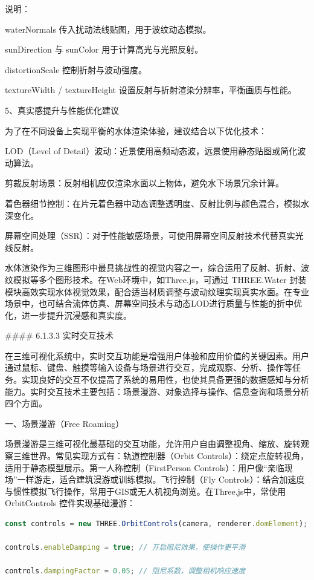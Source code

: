 说明：

waterNormals 传入扰动法线贴图，用于波纹动态模拟。

sunDirection 与 sunColor 用于计算高光与光照反射。

distortionScale 控制折射与波动强度。

textureWidth / textureHeight 设置反射与折射渲染分辨率，平衡画质与性能。

5、真实感提升与性能优化建议

为了在不同设备上实现平衡的水体渲染体验，建议结合以下优化技术：

LOD（Level of Detail）波动：近景使用高频动态波，远景使用静态贴图或简化波动算法。

剪裁反射场景：反射相机应仅渲染水面以上物体，避免水下场景冗余计算。

着色器细节控制：在片元着色器中动态调整透明度、反射比例与颜色混合，模拟水深变化。

屏幕空间处理（SSR）：对于性能敏感场景，可使用屏幕空间反射技术代替真实光线反射。

水体渲染作为三维图形中最具挑战性的视觉内容之一，综合运用了反射、折射、波纹模拟等多个图形技术。在Web环境中，如Three.js，可通过 THREE.Water 封装模块高效实现水体视觉效果，配合适当材质调整与波动纹理实现真实水面。在专业场景中，也可结合流体仿真、屏幕空间技术与动态LOD进行质量与性能的折中优化，进一步提升沉浸感和真实度。

\#\#\#\# 6.1.3.3 实时交互技术

在三维可视化系统中，实时交互功能是增强用户体验和应用价值的关键因素。用户通过鼠标、键盘、触摸等输入设备与场景进行交互，完成观察、分析、操作等任务。实现良好的交互不仅提高了系统的易用性，也使其具备更强的数据感知与分析能力。实时交互技术主要包括：场景漫游、对象选择与操作、信息查询和场景分析四个方面。

一、场景漫游（Free Roaming）

场景漫游是三维可视化最基础的交互功能，允许用户自由调整视角、缩放、旋转观察三维世界。常见实现方式有：轨道控制器（Orbit Controls）：绕定点旋转视角，适用于静态模型展示。第一人称控制（FirstPerson Controls）：用户像``亲临现场''一样游走，适合建筑漫游或训练模拟。飞行控制（Fly Controls）：结合加速度与惯性模拟飞行操作，常用于GIS或无人机视角浏览。在Three.js中，常使用 OrbitControls 控件实现基础漫游：

\begin{lstlisting}[language=Javascript]
const controls = new THREE.OrbitControls(camera, renderer.domElement);

controls.enableDamping = true; // 开启阻尼效果，使操作更平滑

controls.dampingFactor = 0.05; // 阻尼系数，调整相机响应速度
\end{lstlisting}

